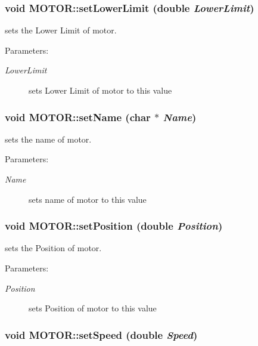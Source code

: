 \subsubsection{\setlength{\rightskip}{0pt plus 5cm}void MOTOR::set\-Lower\-Limit (double {\em Lower\-Limit})}\label{classMOTOR_35eb6a07078a37fd72268741e699ff51}


sets the Lower Limit of motor. \begin{Desc}
\item[Parameters:]
\begin{description}
\item[{\em Lower\-Limit}]sets Lower Limit of motor to this value \end{description}
\end{Desc}
\subsubsection{\setlength{\rightskip}{0pt plus 5cm}void MOTOR::set\-Name (char $\ast$ {\em Name})}\label{classMOTOR_32b503c8cf6838865a50c71d93f2fc99}


sets the name of motor. \begin{Desc}
\item[Parameters:]
\begin{description}
\item[{\em Name}]sets name of motor to this value \end{description}
\end{Desc}
\subsubsection{\setlength{\rightskip}{0pt plus 5cm}void MOTOR::set\-Position (double {\em Position})}\label{classMOTOR_48fe2a31182ae47bacc301f0ee79c0e2}


sets the Position of motor. \begin{Desc}
\item[Parameters:]
\begin{description}
\item[{\em Position}]sets Position of motor to this value \end{description}
\end{Desc}
\subsubsection{\setlength{\rightskip}{0pt plus 5cm}void MOTOR::set\-Speed (double {\em Speed})}\label{classMOTOR_ef550785033008c8df58f2bb24e2f971}


